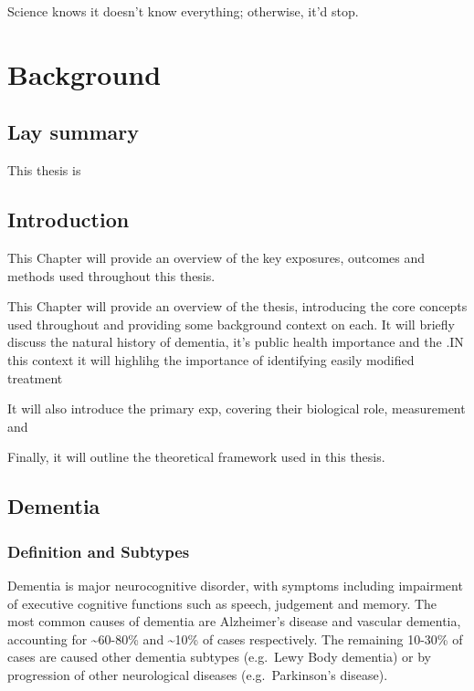 \documentclass[a4paper, twoside]{templates/ociamthesis}
\begin{document}
\begin{savequote}
Science knows it doesn't know everything; otherwise, it'd stop.
\end{savequote}



\hypertarget{background-heading}{%
\chapter{Background}\label{background-heading}}

\minitoc 

\hypertarget{lay-summary}{%
\section{Lay summary}\label{lay-summary}}

This thesis is

\hypertarget{introduction}{%
\section{Introduction}\label{introduction}}

This Chapter will provide an overview of the key exposures, outcomes and methods used throughout this thesis.

This Chapter will provide an overview of the thesis, introducing the core concepts used throughout and providing some background context on each. It will briefly discuss the natural history of dementia, it's public health importance and the .IN this context it will highlihg the importance of identifying easily modified treatment

It will also introduce the primary exp, covering their biological role, measurement and

Finally, it will outline the theoretical framework used in this thesis.

\hypertarget{dementia}{%
\section{Dementia}\label{dementia}}

\hypertarget{definition-and-subtypes}{%
\subsection{Definition and Subtypes}\label{definition-and-subtypes}}

Dementia is major neurocognitive disorder, with symptoms including impairment of executive cognitive functions such as speech, judgement and memory. The most common causes of dementia are Alzheimer's disease and vascular dementia, accounting for \textasciitilde60-80\% and \textasciitilde10\% of cases respectively. The remaining 10-30\% of cases are caused other dementia subtypes (e.g.~Lewy Body dementia) or by progression of other neurological diseases (e.g.~Parkinson's disease).
\end{document}
